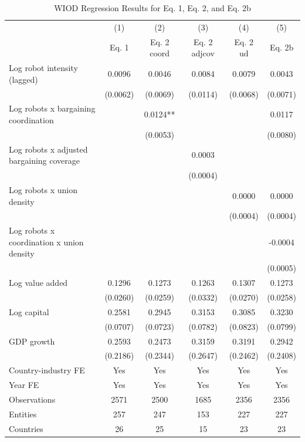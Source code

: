 \begin{table}[!htbp]
\centering
\begin{threeparttable}
\caption{WIOD Regression Results for Eq. 1, Eq. 2, and Eq. 2b}
\label{tab:wiod_regression_table_combined}
\small
\begin{tabular}{lccccc}
\toprule
 & (1) & (2) & (3) & (4) & (5) \\
 & Eq. 1 & Eq. 2 coord & Eq. 2 adjcov & Eq. 2 ud & Eq. 2b \\
\midrule
Log robot intensity (lagged) & 0.0096 & 0.0046 & 0.0084 & 0.0079 & 0.0043 \\
 & (0.0062) & (0.0069) & (0.0114) & (0.0068) & (0.0071) \\
\addlinespace[0.2em]
Log robots x bargaining coordination &  & 0.0124** &  &  & 0.0117 \\
 &  & (0.0053) &  &  & (0.0080) \\
\addlinespace[0.2em]
Log robots x adjusted bargaining coverage &  &  & 0.0003 &  &  \\
 &  &  & (0.0004) &  &  \\
\addlinespace[0.2em]
Log robots x union density &  &  &  & 0.0000 & 0.0000 \\
 &  &  &  & (0.0004) & (0.0004) \\
\addlinespace[0.2em]
Log robots x coordination x union density &  &  &  &  & -0.0004 \\
 &  &  &  &  & (0.0005) \\
\addlinespace[0.2em]
Log value added & 0.1296 & 0.1273 & 0.1263 & 0.1307 & 0.1273 \\
 & (0.0260) & (0.0259) & (0.0332) & (0.0270) & (0.0258) \\
\addlinespace[0.2em]
Log capital & 0.2581 & 0.2945 & 0.3153 & 0.3085 & 0.3230 \\
 & (0.0707) & (0.0723) & (0.0782) & (0.0823) & (0.0799) \\
\addlinespace[0.2em]
GDP growth & 0.2593 & 0.2473 & 0.3159 & 0.3191 & 0.2942 \\
 & (0.2186) & (0.2344) & (0.2647) & (0.2462) & (0.2408) \\
\midrule
Country-industry FE & Yes & Yes & Yes & Yes & Yes \\
Year FE & Yes & Yes & Yes & Yes & Yes \\
Observations & 2571 & 2500 & 1685 & 2356 & 2356 \\
Entities & 257 & 247 & 153 & 227 & 227 \\
Countries & 26 & 25 & 15 & 23 & 23 \\

\end{tabular}
\end{threeparttable}
\end{table}
